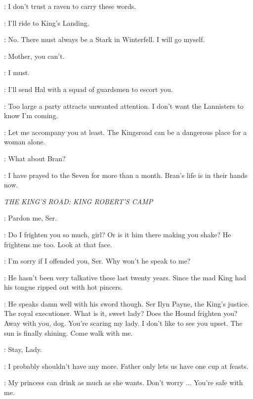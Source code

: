 \CATELYN: I don't trust a raven to carry these words. 

\ROBB: I'll ride to King's Landing. 

\CATELYN: No. There must always be a Stark in Winterfell. I will go myself. 

\ROBB: Mother, you can't. 

\CATELYN: I must. 

\RODRIK: I'll send Hal with a squad of guardsmen to escort you. 

\CATELYN: Too large a party attracts unwanted attention. I don't want the Lannisters to know I'm coming. 

\RODRIK: Let me accompany you at least. The Kingsroad can be a dangerous place for a woman alone. 

\ROBB: What about Bran? 

\CATELYN: I have prayed to the Seven for more than a month. Bran's life is in their hands now. 


\scene

\textit{THE KING'S ROAD: KING ROBERT'S CAMP} 


\SANSA: Pardon me, Ser. 


\HOUND: Do I frighten you so much, girl? Or is it him there making you shake? He frightens me too. Look at that face. 

\SANSA:  I'm sorry if I offended you, Ser.  Why won't he speak to me? 

\HOUND: He hasn't been very talkative these last twenty years. Since the mad King had his tongue ripped out with hot pincers. 

\JOFFREY: He speaks damn well with his sword though. Ser Ilyn Payne, the King's justice. The royal executioner. What is it, sweet lady? Does the Hound frighten you? Away with you, dog. You're scaring my lady. I don't like to see you upset. The sun is finally shining. Come walk with me. 

\SANSA: Stay, Lady. 


\SANSA: I probably shouldn't have any more. Father only lets us have one cup at feasts. 

\JOFFREY: My princess can drink as much as she wants. Don't worry $\ldots$ You're safe with me. 

